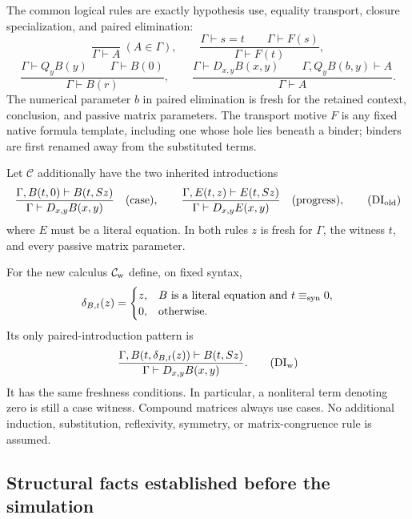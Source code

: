 The common logical rules are exactly hypothesis use, equality transport,
closure specialization, and paired elimination:
\[
 \frac{}{\Gamma\vdash A}\ (A\in\Gamma),
 \qquad
 \frac{\Gamma\vdash s=t\qquad\Gamma\vdash F(s)}
      {\Gamma\vdash F(t)},
\]
\[
 \frac{\Gamma\vdash Q_yB(y)\qquad\Gamma\vdash B(0)}
      {\Gamma\vdash B(r)},
 \qquad
 \frac{\Gamma\vdash D_{x,y}B(x,y)\qquad
       \Gamma,Q_yB(b,y)\vdash A}
      {\Gamma\vdash A}.
\]
The numerical parameter $b$ in paired elimination is fresh for the
retained context, conclusion, and passive matrix parameters.  The
transport motive $F$ is any fixed native formula template, including
one whose hole lies beneath a binder; binders are first renamed away
from the substituted terms.

Let $\mathcal C$ additionally have the two inherited introductions
\[
 \frac{\Gamma,B(t,0)\vdash B(t,Sz)}
      {\Gamma\vdash D_{x,y}B(x,y)}
 \quad\text{(case)},
 \qquad
 \frac{\Gamma,E(t,z)\vdash E(t,Sz)}
      {\Gamma\vdash D_{x,y}E(x,y)}
 \quad\text{(progress)},
 \tag{DI$_{\rm old}$}
\]
where $E$ must be a literal equation.  In both rules $z$ is fresh for
$\Gamma$, the witness $t$, and every passive matrix parameter.

For the new calculus $\mathcal C_{\rm w}$ define, on fixed syntax,
\[
 \delta_{B,t}(z)=
 \begin{cases}
 z,& B\text{ is a literal equation and }t\equiv_{\rm syn}0,\\
 0,&\text{otherwise}.
 \end{cases}
\]
Its only paired-introduction pattern is
\[
 \frac{\Gamma,B(t,\delta_{B,t}(z))\vdash B(t,Sz)}
      {\Gamma\vdash D_{x,y}B(x,y)}.
 \tag{DI$_{\rm w}$}\label{eq:det-witness-intro}
\]
It has the same freshness conditions.  In particular, a nonliteral
term denoting zero is still a case witness.  Compound matrices always
use cases.  No additional induction, substitution, reflexivity, symmetry,
or matrix-congruence rule is assumed.

\subsection{Structural facts established before the simulation}

